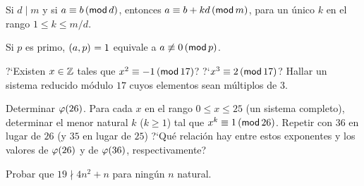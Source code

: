 \begin{ejerCongruencias}
	Si $d\mid m$ y si $a\equiv b\tmodulo[d]$, entonces
	$a\equiv b+kd\tmodulo[m]$, para un \'unico $k$ en el rango
	$1\leq k\leq m/d$.
\end{ejerCongruencias}

\begin{ejerCongruencias}
	Si $p$ es primo, $\mcd{a,p}=1$ equivale a $a\not\equiv 0\tmodulo[p]$.
\end{ejerCongruencias}

\begin{ejerCongruencias}
	?`Existen $x\in\Enteros$ tales que $x^2\equiv -1\tmodulo[17]$?
	?`$x^3\equiv 2\tmodulo[17]$? Hallar un sistema reducido m\'odulo $17$
	cuyos elementos sean m\'ultiplos de $3$.
\end{ejerCongruencias}

\begin{ejerCongruencias}
	Determinar $\eulerphi(26)$. Para cada $x$ en el rango
	$0\leq x\leq 25$ (un sistema completo), determinar el menor
	natural $k$ ($k\geq 1$) tal que $x^k\equiv 1\tmodulo[26]$.
	Repetir con $36$ en lugar de $26$ (y $35$ en lugar de $25$)
	?`Qu\'e relaci\'on hay entre estos exponentes y los valores de
	$\eulerphi(26)$ y de $\eulerphi(36)$, respectivamente?
\end{ejerCongruencias}

\begin{ejerCongruencias}
	Probar que $19\nmid 4n^2+n$ para ning\'un $n$ natural.
\end{ejerCongruencias}


